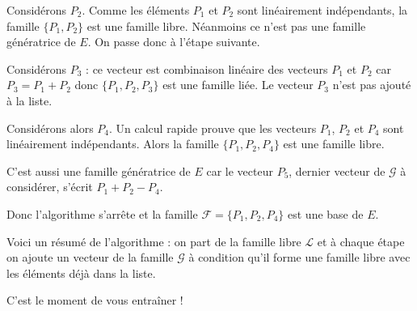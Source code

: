 \change
Considérons $P_2$. 
  Comme les éléments $P_1$ et $P_2$ sont linéairement indépendants, la famille
  $\{ P_1, P_2 \}$ est une famille libre. Néanmoins ce n'est pas une famille génératrice de $E$. On passe donc à l'étape suivante.
  
  \change
Considérons $P_3$ : 
  ce vecteur est combinaison linéaire des vecteurs  $P_1$ et $P_2$ car 
  $P_3 = P_1 + P_2$ donc $\{P_1, P_2, P_3 \}$ est une famille liée. Le vecteur $P_3$ n'est pas ajouté à la liste.
  
  \change
    Considérons alors $P_4$.  Un calcul rapide prouve que les vecteurs $P_1$, $P_2$  et 
  $P_4$ sont linéairement indépendants. Alors  la famille $ \{P_1, P_2, P_4\}$ 
  est une famille libre. 
  
  \change
  C'est aussi une famille génératrice de $E$ car le vecteur $P_5$, dernier vecteur de $\mathcal{G}$ à considérer, s'écrit $P_1+P_2-P_4$.
 
 \change
  Donc l'algorithme s'arr\^ete et la famille $\mathcal{F} = \{P_1, P_2, P_4\}$ est une base de $E$.

Voici un résumé de l'algorithme : on part de la famille libre $\mathcal{L}$ et 
à chaque étape on ajoute un vecteur
de la famille $\mathcal{G}$ à condition qu'il forme 
une famille libre avec les éléments déjà dans la liste.

% 
% 
% 
% 
% 
  
\diapo
C'est le moment de vous entraîner !


